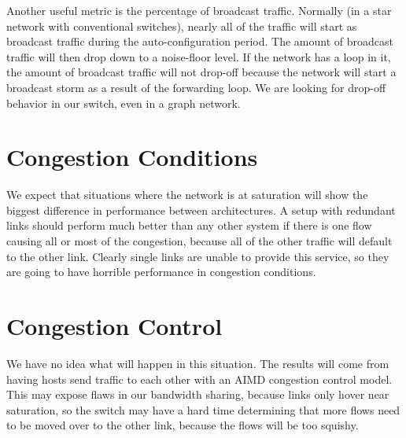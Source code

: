 \documentclass{article}
\begin{document}
Another useful metric is the percentage of broadcast traffic.
Normally (in a star network with conventional switches), nearly all of the traffic will start as broadcast traffic during the auto-configuration period.
The amount of broadcast traffic will then drop down to a noise-floor level.
If the network has a loop in it, the amount of broadcast traffic will not drop-off because the network will start a broadcast storm as a result of the forwarding loop.
We are looking for drop-off behavior in our switch, even in a graph network.

\section{Congestion Conditions}
We expect that situations where the network is at saturation will show the biggest difference in performance between architectures.
A setup with redundant links should perform much better than any other system if there is one flow causing all or most of the congestion, because all of the other traffic will default to the other link.
Clearly single links are unable to provide this service, so they are going to have horrible performance in congestion conditions.
\section{Congestion Control}
We have no idea what will happen in this situation.
The results will come from having hosts send traffic to each other with an AIMD congestion control model.
This may expose flaws in our bandwidth sharing, because links only hover near saturation, so the switch may have a hard time determining that more flows need to be moved over to the other link, because the flows will be too squishy.
\end{document}
